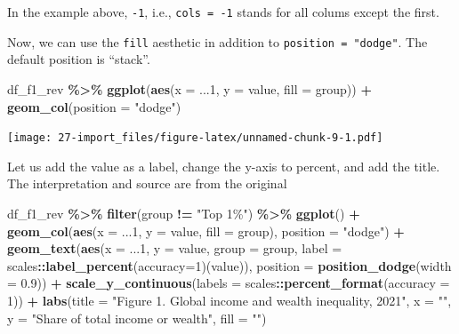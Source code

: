 \documentclass[
  xelatex, ja=standard]{bxjsbook}
\newenvironment{Shaded}{\begin{snugshade}}{\end{snugshade}}
\newcommand{\AttributeTok}[1]{\textcolor[rgb]{0.13,0.29,0.53}{#1}}
\newcommand{\DecValTok}[1]{\textcolor[rgb]{0.00,0.00,0.81}{#1}}
\newcommand{\FloatTok}[1]{\textcolor[rgb]{0.00,0.00,0.81}{#1}}
\newcommand{\FunctionTok}[1]{\textcolor[rgb]{0.13,0.29,0.53}{\textbf{#1}}}
\newcommand{\NormalTok}[1]{#1}
\newcommand{\SpecialCharTok}[1]{\textcolor[rgb]{0.81,0.36,0.00}{\textbf{#1}}}
\newcommand{\StringTok}[1]{\textcolor[rgb]{0.31,0.60,0.02}{#1}}
\theoremstyle{definition}
\theoremstyle{definition}
\theoremstyle{definition}
\theoremstyle{definition}
\theoremstyle{remark}
\begin{document}
In the example above, \texttt{-1}, i.e., \texttt{cols\ =\ -1} stands for all colums except the first.

Now, we can use the \texttt{fill} aesthetic in addition to \texttt{position\ =\ "dodge"}. The default position is ``stack''.

\begin{Shaded}
\begin{Highlighting}[]
\NormalTok{df\_f1\_rev }\SpecialCharTok{\%\textgreater{}\%} 
  \FunctionTok{ggplot}\NormalTok{(}\FunctionTok{aes}\NormalTok{(}\AttributeTok{x =}\NormalTok{ ...}\DecValTok{1}\NormalTok{, }\AttributeTok{y =}\NormalTok{ value, }\AttributeTok{fill =}\NormalTok{ group)) }\SpecialCharTok{+}
  \FunctionTok{geom\_col}\NormalTok{(}\AttributeTok{position =} \StringTok{"dodge"}\NormalTok{)}
\end{Highlighting}
\end{Shaded}

\texttt{[image: 27-import\_files/figure-latex/unnamed-chunk-9-1.pdf]}

Let us add the value as a label, change the y-axis to percent, and add the title. The interpretation and source are from the original

\begin{Shaded}
\begin{Highlighting}[]
\NormalTok{df\_f1\_rev }\SpecialCharTok{\%\textgreater{}\%} \FunctionTok{filter}\NormalTok{(group }\SpecialCharTok{!=} \StringTok{"Top 1\%"}\NormalTok{) }\SpecialCharTok{\%\textgreater{}\%}
  \FunctionTok{ggplot}\NormalTok{() }\SpecialCharTok{+}
  \FunctionTok{geom\_col}\NormalTok{(}\FunctionTok{aes}\NormalTok{(}\AttributeTok{x =}\NormalTok{ ...}\DecValTok{1}\NormalTok{, }\AttributeTok{y =}\NormalTok{ value, }\AttributeTok{fill =}\NormalTok{ group), }\AttributeTok{position =} \StringTok{"dodge"}\NormalTok{) }\SpecialCharTok{+}
  \FunctionTok{geom\_text}\NormalTok{(}\FunctionTok{aes}\NormalTok{(}\AttributeTok{x =}\NormalTok{ ...}\DecValTok{1}\NormalTok{, }\AttributeTok{y =}\NormalTok{ value, }\AttributeTok{group =}\NormalTok{ group, }
            \AttributeTok{label =}\NormalTok{ scales}\SpecialCharTok{::}\FunctionTok{label\_percent}\NormalTok{(}\AttributeTok{accuracy=}\DecValTok{1}\NormalTok{)(value)), }
            \AttributeTok{position =} \FunctionTok{position\_dodge}\NormalTok{(}\AttributeTok{width =} \FloatTok{0.9}\NormalTok{)) }\SpecialCharTok{+} 
  \FunctionTok{scale\_y\_continuous}\NormalTok{(}\AttributeTok{labels =}\NormalTok{ scales}\SpecialCharTok{::}\FunctionTok{percent\_format}\NormalTok{(}\AttributeTok{accuracy =} \DecValTok{1}\NormalTok{)) }\SpecialCharTok{+}
  \FunctionTok{labs}\NormalTok{(}\AttributeTok{title =} \StringTok{"Figure 1. Global income and wealth inequality, 2021"}\NormalTok{,}
       \AttributeTok{x =} \StringTok{""}\NormalTok{, }\AttributeTok{y =} \StringTok{"Share of total income or wealth"}\NormalTok{, }\AttributeTok{fill =} \StringTok{""}\NormalTok{)}
\end{Highlighting}
\end{Shaded}
\end{document}
